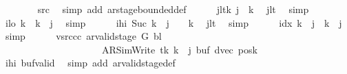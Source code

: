 \begin{isabellebody}
\ \ \ \ \ \ \isamarkupfalse%
\ src{}\ \isamarkupfalse%
\ {\isacharparenleft}{\kern0pt}simp\ add{\isacharcolon}{\kern0pt}\ ar{\isacharunderscore}{\kern0pt}stage{\isacharunderscore}{\kern0pt}bounded{\isacharunderscore}{\kern0pt}def{\isacharparenright}{\kern0pt}\isanewline
\ \ \ \ \isamarkupfalse%
\ jltk{\isacharcolon}{\kern0pt}\ {\isachardoublequoteopen}j\ {\isacharless}{\kern0pt}\ {\isacharquery}{\kern0pt}k{\isachardoublequoteclose}\ \isamarkupfalse%
\ jlt\ \isamarkupfalse%
\ simp\isanewline
\ \ \ \ \isamarkupfalse%
\ ilo{\isacharcolon}{\kern0pt}\ {\isachardoublequoteopen}{\isacharquery}{\kern0pt}k\ {\isasymle}\ {\isacharquery}{\kern0pt}k\ {\isacharplus}{\kern0pt}\ j{\isachardoublequoteclose}\ \isamarkupfalse%
\ simp\isanewline
\ \ \ \ \isamarkupfalse%
\ ihi{\isacharcolon}{\kern0pt}\ {\isachardoublequoteopen}Suc\ {\isacharparenleft}{\kern0pt}{\isacharquery}{\kern0pt}k\ {\isacharplus}{\kern0pt}\ j{\isacharparenright}{\kern0pt}\ {\isacharless}{\kern0pt}\ {}\ {\isacharasterisk}{\kern0pt}\ {\isacharquery}{\kern0pt}k{\isachardoublequoteclose}\ \isamarkupfalse%
\ jlt\ \isamarkupfalse%
\ simp\isanewline
\ \ \ \ \isamarkupfalse%
\ idx{\isacharcolon}{\kern0pt}\ {\isachardoublequoteopen}{\isacharquery}{\kern0pt}k\ {\isacharplus}{\kern0pt}\ j\ {\isacharminus}{\kern0pt}\ {\isacharquery}{\kern0pt}k\ {\isacharequal}{\kern0pt}\ j{\isachardoublequoteclose}\ \isamarkupfalse%
\ simp\isanewline
\ \ \ \ \isamarkupfalse%
\ vsrc{\isacharunderscore}{\kern0pt}cc{\isacharcolon}{\kern0pt}\ {\isachardoublequoteopen}ar{\isacharunderscore}{\kern0pt}valid{\isacharunderscore}{\kern0pt}stage\ {\isacharquery}{\kern0pt}G\ {\isacharquery}{\kern0pt}bl\isanewline
\ \ \ \ \ \ \ \ \ \ \ \ \ \ \ \ \ \ \ \ \ {\isacharparenleft}{\kern0pt}AR{\isacharunderscore}{\kern0pt}SimWrite{\isacharcomma}{\kern0pt}\ tk{\isacharcomma}{\kern0pt}\ {\isacharquery}{\kern0pt}k\ {\isacharplus}{\kern0pt}\ j{\isacharcomma}{\kern0pt}\ buf{\isacharcomma}{\kern0pt}\ dvec{\isacharcomma}{\kern0pt}\ posk{\isacharparenright}{\kern0pt}{\isachardoublequoteclose}\isanewline
\ \ \ \ \ \ \isamarkupfalse%
\ ihi\ buf{\isacharunderscore}{\kern0pt}valid\ \isamarkupfalse%
\ {\isacharparenleft}{\kern0pt}simp\ add{\isacharcolon}{\kern0pt}\ ar{\isacharunderscore}{\kern0pt}valid{\isacharunderscore}{\kern0pt}stage{\isacharunderscore}{\kern0pt}def{\isacharparenright}{\kern0pt}\isanewline

\end{isabellebody}
